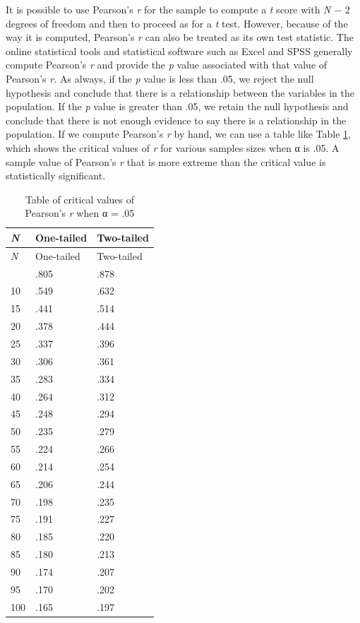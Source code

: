 \documentclass[
]{krantz}
\begin{document}
It is possible to use Pearson's \emph{r} for the sample to compute a \emph{t} score with \emph{N} − 2 degrees of freedom and then to proceed as for a \emph{t} test. However, because of the way it is computed, Pearson's \emph{r} can also be treated as its own test statistic. The online statistical tools and statistical software such as Excel and SPSS generally compute Pearson's \emph{r} and provide the \emph{p} value associated with that value of Pearson's \emph{r.} As always, if the \emph{p} value is less than .05, we reject the null hypothesis and conclude that there is a relationship between the variables in the population. If the \emph{p} value is greater than .05, we retain the null hypothesis and conclude that there is not enough evidence to say there is a relationship in the population. If we compute Pearson's \emph{r} by hand, we can use a table like Table \ref{tab:rcrit}, which shows the critical values of \emph{r} for various samples sizes when α is .05. A sample value of Pearson's \emph{r} that is more extreme than the critical value is statistically significant.

\begin{longtable}[]{@{}lll@{}}
\caption{\label{tab:rcrit} Table of critical values of Pearson's \emph{r} when α = .05}\tabularnewline
\toprule\noalign{}
\emph{N} & One-tailed & Two-tailed \\
\midrule\noalign{}
\endfirsthead
\toprule\noalign{}
\emph{N} & One-tailed & Two-tailed \\
\midrule\noalign{}
\endhead
\bottomrule\noalign{}
\endlastfoot
5 & .805 & .878 \\
10 & .549 & .632 \\
15 & .441 & .514 \\
20 & .378 & .444 \\
25 & .337 & .396 \\
30 & .306 & .361 \\
35 & .283 & .334 \\
40 & .264 & .312 \\
45 & .248 & .294 \\
50 & .235 & .279 \\
55 & .224 & .266 \\
60 & .214 & .254 \\
65 & .206 & .244 \\
70 & .198 & .235 \\
75 & .191 & .227 \\
80 & .185 & .220 \\
85 & .180 & .213 \\
90 & .174 & .207 \\
95 & .170 & .202 \\
100 & .165 & .197 \\
\end{longtable}
\end{document}
